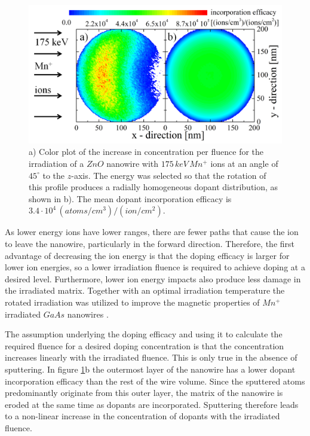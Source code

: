 \begin{figure}
	\centering
		\includegraphics[width=.8\textwidth]{images/iradinacrosssection.png}
	\caption{a) Color plot of the increase in concentration per fluence for the irradiation of a $ZnO$ nanowire with $175\,keV\,Mn^+$ ions at an angle of $45^\circ$ to the $z$-axis. The energy was selected so that the rotation of this profile produces a radially homogeneous dopant distribution, as shown in b). The mean dopant incorporation efficacy is $3.4\cdot10^4\,(atoms/cm^3)/(ion/cm^2)$.}
	\label{iradinacrossection}
\end{figure} 

As lower energy ions have lower ranges, there are fewer paths that cause the ion to leave the nanowire, particularly in the forward direction. Therefore, the first advantage of decreasing the ion energy is that the doping efficacy is larger for lower ion energies, so a lower irradiation fluence is required to achieve doping at a desired level. Furthermore, lower ion energy impacts also produce less damage in the irradiated matrix. Together with an optimal irradiation temperature the rotated irradiation was utilized to improve the magnetic properties of $Mn^+$ irradiated $GaAs$ nanowires \cite{borschel_new_2011,paschoal_hopping_2012,borschel_ion-solid_2012,kumar_magnetic_2013,paschoal_magnetoresistance_2014}. 

The assumption underlying the doping efficacy and using it to calculate the required fluence for a desired doping concentration is that the concentration increases linearly with the irradiated fluence. This is only true in the absence of sputtering. In figure \ref{iradinacrossection}b the outermost layer of the nanowire has a lower dopant incorporation efficacy than the rest of the wire volume. Since the sputtered atoms predominantly originate from this outer layer, the matrix of the nanowire is eroded at the same time as dopants are incorporated. Sputtering therefore leads to a non-linear increase in the concentration of dopants with the irradiated fluence.

